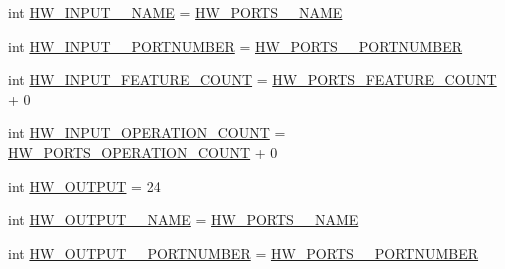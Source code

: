\begin{DoxyCompactItemize}
\item 
int \hyperlink{interfaceshootingmachineemfmodel_1_1_shootingmachineemfmodel_package_aca3df42c3daea63181ee2a2aa5ed1fac}{H\-W\-\_\-\-I\-N\-P\-U\-T\-\_\-\-\_\-\-N\-A\-M\-E} = \hyperlink{interfaceshootingmachineemfmodel_1_1_shootingmachineemfmodel_package_a8c7830b95625a0ce6a38f99f0bbb4a6f}{H\-W\-\_\-\-P\-O\-R\-T\-S\-\_\-\-\_\-\-N\-A\-M\-E}
\item 
int \hyperlink{interfaceshootingmachineemfmodel_1_1_shootingmachineemfmodel_package_ac54ab200e6b01aa749998ba59d67d36b}{H\-W\-\_\-\-I\-N\-P\-U\-T\-\_\-\-\_\-\-P\-O\-R\-T\-N\-U\-M\-B\-E\-R} = \hyperlink{interfaceshootingmachineemfmodel_1_1_shootingmachineemfmodel_package_af1a55b03e332449551c73de215f7cbbf}{H\-W\-\_\-\-P\-O\-R\-T\-S\-\_\-\-\_\-\-P\-O\-R\-T\-N\-U\-M\-B\-E\-R}
\item 
int \hyperlink{interfaceshootingmachineemfmodel_1_1_shootingmachineemfmodel_package_a535000a6deb669d11da173c3d44815a2}{H\-W\-\_\-\-I\-N\-P\-U\-T\-\_\-\-F\-E\-A\-T\-U\-R\-E\-\_\-\-C\-O\-U\-N\-T} = \hyperlink{interfaceshootingmachineemfmodel_1_1_shootingmachineemfmodel_package_a07e6faf7371ad8351da3b4600954f204}{H\-W\-\_\-\-P\-O\-R\-T\-S\-\_\-\-F\-E\-A\-T\-U\-R\-E\-\_\-\-C\-O\-U\-N\-T} + 0
\item 
int \hyperlink{interfaceshootingmachineemfmodel_1_1_shootingmachineemfmodel_package_af19839a18788f1df9c7076b1f331b660}{H\-W\-\_\-\-I\-N\-P\-U\-T\-\_\-\-O\-P\-E\-R\-A\-T\-I\-O\-N\-\_\-\-C\-O\-U\-N\-T} = \hyperlink{interfaceshootingmachineemfmodel_1_1_shootingmachineemfmodel_package_a5f85f99a2b80ea1b9f8c81dc620e69b3}{H\-W\-\_\-\-P\-O\-R\-T\-S\-\_\-\-O\-P\-E\-R\-A\-T\-I\-O\-N\-\_\-\-C\-O\-U\-N\-T} + 0
\item 
int \hyperlink{interfaceshootingmachineemfmodel_1_1_shootingmachineemfmodel_package_a4bae4f84bd29c449d0339215d739b21b}{H\-W\-\_\-\-O\-U\-T\-P\-U\-T} = 24
\item 
int \hyperlink{interfaceshootingmachineemfmodel_1_1_shootingmachineemfmodel_package_a82c44c284e4ef61163abe3704089bfad}{H\-W\-\_\-\-O\-U\-T\-P\-U\-T\-\_\-\-\_\-\-N\-A\-M\-E} = \hyperlink{interfaceshootingmachineemfmodel_1_1_shootingmachineemfmodel_package_a8c7830b95625a0ce6a38f99f0bbb4a6f}{H\-W\-\_\-\-P\-O\-R\-T\-S\-\_\-\-\_\-\-N\-A\-M\-E}
\item 
int \hyperlink{interfaceshootingmachineemfmodel_1_1_shootingmachineemfmodel_package_a2407c3a47af8c06cbb4aabb70268949d}{H\-W\-\_\-\-O\-U\-T\-P\-U\-T\-\_\-\-\_\-\-P\-O\-R\-T\-N\-U\-M\-B\-E\-R} = \hyperlink{interfaceshootingmachineemfmodel_1_1_shootingmachineemfmodel_package_af1a55b03e332449551c73de215f7cbbf}{H\-W\-\_\-\-P\-O\-R\-T\-S\-\_\-\-\_\-\-P\-O\-R\-T\-N\-U\-M\-B\-E\-R}

\end{DoxyCompactItemize}
